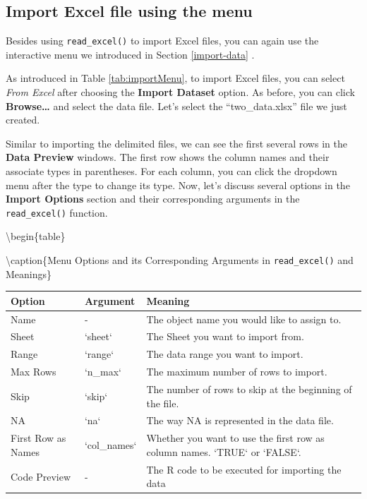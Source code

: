 \documentclass[
]{book}
\begin{document}
\hypertarget{import-excel-file-using-the-menu}{%
\subsection{Import Excel file using the menu}\label{import-excel-file-using-the-menu}}

Besides using \texttt{read\_excel()} to import Excel files, you can again use the interactive menu we introduced in Section \ref{import-data} .

As introduced in Table \ref{tab:importMenu}, to import Excel files, you can select \emph{From Excel} after choosing the \textbf{Import Dataset} option. As before, you can click \textbf{Browse\ldots{}} and select the data file. Let's select the ``two\_data.xlsx'' file we just created.

Similar to importing the delimited files, we can see the first several rows in the \textbf{Data Preview} windows. The first row shows the column names and their associate types in parentheses. For each column, you can click the dropdown menu after the type to change its type. Now, let's discuss several options in the \textbf{Import Options} section and their corresponding arguments in the \texttt{read\_excel()} function.

\textbackslash begin\{table\}

\textbackslash caption\{\label{tab:importExcelOptions}Menu Options and its Corresponding Arguments in \texttt{read\_excel()} and Meanings\}
\centering

\begin{tabular}[t]{l|l|l}
\hline
Option & Argument & Meaning\\
\hline
Name & - & The object name you would like to assign to.\\
\hline
Sheet & `sheet` & The Sheet you want to import from.\\
\hline
Range & `range` & The data range you want to import.\\
\hline
Max Rows & `n\_max` & The maximum number of rows to import.\\
\hline
Skip & `skip` & The number of rows to skip at the beginning of the file.\\
\hline
NA & `na` & The way NA is represented in the data file.\\
\hline
First Row as Names & `col\_names` & Whether you want to use the first row as column names. `TRUE` or `FALSE`.\\
\hline
Code Preview & - & The R code to be executed for importing the data\\
\hline
\end{tabular}
\end{document}
